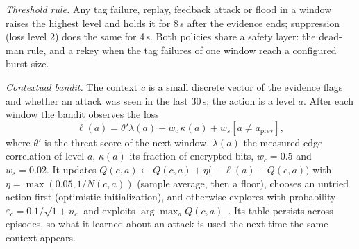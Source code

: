 \textit{Threshold rule.} Any tag failure, replay, feedback attack or flood in a window raises the highest level and holds it for 8\,s after the evidence ends; suppression (loss level 2) does the same for 4\,s. Both policies share a safety layer: the dead-man rule, and a rekey when the tag failures of one window reach a configured burst size.

\textit{Contextual bandit.} The context $c$ is a small discrete vector of the evidence flags and whether an attack was seen in the last 30\,s; the action is a level $a$. After each window the bandit observes the loss
\begin{equation}
\ell(a) = \theta' \lambda(a) + w_c\, \kappa(a) + w_s [a \ne a_{\mathrm{prev}}],
\label{eq:loss}
\end{equation}
where $\theta'$ is the threat score of the next window, $\lambda(a)$ the measured edge correlation of level $a$, $\kappa(a)$ its fraction of encrypted bits, $w_c = 0.5$ and $w_s = 0.02$. It updates $Q(c, a) \leftarrow Q(c, a) + \eta \bigl(-\ell(a) - Q(c, a)\bigr)$ with $\eta = \max(0.05, 1/N(c,a))$ (sample average, then a floor), chooses an untried action first (optimistic initialization), and otherwise explores with probability $\varepsilon_c = 0.1/\sqrt{1 + n_c}$ and exploits $\arg\max_a Q(c, a)$~\cite{sutton2018}. Its table persists across episodes, so what it learned about an attack is used the next time the same context appears.
